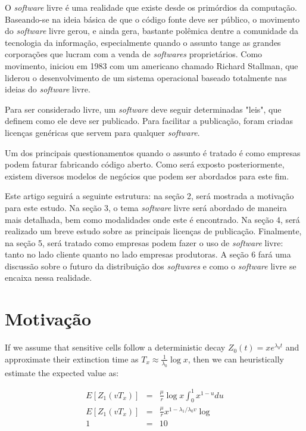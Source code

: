 \documentclass{classe_cn}                 %
\begin{document}
O \textit{software} livre é uma realidade que existe desde os primórdios da computação. Baseando-se na ideia básica de que o código fonte deve ser público, o movimento do \textit{software} livre gerou, e ainda gera, bastante polêmica dentre a comunidade da tecnologia da informação, especialmente quando o assunto tange as grandes corporações que lucram com a venda de \textit{softwares} proprietários. Como movimento, iniciou em 1983 \cite{Campos:2016} com um americano chamado Richard Stallman, que liderou o desenvolvimento de um sistema operacional baseado totalmente nas ideias do \textit{software} livre.

Para ser considerado livre, um \textit{software} deve seguir determinadas "leis", que definem como ele deve ser publicado. Para facilitar a publicação, foram criadas licenças genéricas que servem para qualquer \textit{software}.

Um dos principais questionamentos quando o assunto é tratado é como empresas podem faturar fabricando código aberto. Como será exposto posteriormente, existem diversos modelos de negócios que podem ser abordados para este fim.

Este artigo seguirá a seguinte estrutura: na seção 2, será mostrada a motivação para este estudo. Na seção 3, o tema \textit{software} livre será abordado de maneira mais detalhada, bem como modalidades onde este é encontrado. Na seção 4, será realizado um breve estudo sobre as principais licenças de publicação. Finalmente, na seção 5, será tratado como empresas podem fazer o uso de \textit{software} livre: tanto no lado cliente quanto no lado empresas produtoras. A seção 6 fará uma discussão sobre o futuro da distribuição dos \textit{softwares} e como o \textit{software} livre se encaixa nessa realidade.


\section{Motivação}

If we assume that sensitive cells follow a deterministic decay $Z_0(t) = xe^{\lambda_0 t}$ and approximate their extinction time as $T_x \approx \frac{1}{\lambda_0} \log x$, then we can heuristically estimate the expected value as:

\begin{eqnarray}
\label{eqexpmuts}
  E [Z_1(vT_x)] &=& \frac{\mu}{r}\log x \int_0^{1} x^{1-u} du \\
  E [Z_1(vT_x)] &=& \frac{\mu}{r}x^{1-{\lambda_1}/{\lambda_0}v}\log  \\
  1 &=& 10
\end{eqnarray}
\end{document}
